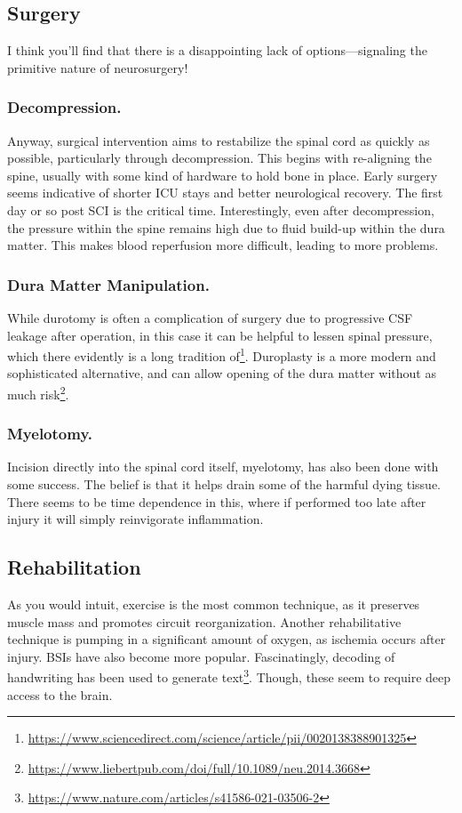 \subsection{Surgery}
I think you'll find that there is a disappointing lack of options---signaling the primitive nature of neurosurgery!

\subsubsection{Decompression.}
 Anyway, surgical intervention aims to restabilize the spinal cord as quickly as possible, particularly through decompression. This begins with re-aligning the spine, usually with some kind of hardware to hold bone in place. Early surgery seems indicative of shorter ICU stays and better neurological recovery. The first day or so post SCI is the critical time. Interestingly, even after decompression, the pressure within the spine remains high due to fluid build-up within the dura matter. This makes blood reperfusion more difficult, leading to more problems. 
 
 \subsubsection{Dura Matter Manipulation.}
 While durotomy is often a complication of surgery due to progressive CSF leakage after operation, in this case it can be helpful to lessen spinal pressure, which there evidently is a long tradition of\footnote{\url{https://www.sciencedirect.com/science/article/pii/0020138388901325}}. Duroplasty is a more modern and sophisticated alternative, and can allow opening of the dura matter without as much risk\footnote{\url{https://www.liebertpub.com/doi/full/10.1089/neu.2014.3668}}.

\subsubsection{Myelotomy.}
Incision directly into the spinal cord itself, myelotomy, has also been done with some success. The belief is that it helps drain some of the harmful dying tissue. There seems to be time dependence in this, where if performed too late after injury it will simply reinvigorate inflammation. 

\subsection{Rehabilitation}
As you would intuit, exercise is the most common technique, as it preserves muscle mass and promotes circuit reorganization. Another rehabilitative technique is pumping in a significant amount of oxygen, as ischemia occurs after injury. BSIs have also become more popular. Fascinatingly, decoding of handwriting has been used to generate text\footnote{\url{https://www.nature.com/articles/s41586-021-03506-2}}. Though, these seem to require deep access to the brain. 



